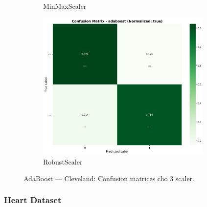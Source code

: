 \begin{figure}[H]
\begin{subfigure}[b]{0.31\textwidth}
\caption{MinMaxScaler}\label{fig:adaboost_clev_cm_minmax}
\end{subfigure}\hfill
\begin{subfigure}[b]{0.31\textwidth}\centering
\includegraphics[width=0.95\textwidth]{Result/cleveland_dataset/confusion_matrices/adaboost_numeric_dataset_RobustScaler.png}
\caption{RobustScaler}\label{fig:adaboost_clev_cm_robust}
\end{subfigure}
\caption{AdaBoost — Cleveland: Confusion matrices cho 3 scaler.}
\label{fig:adaboost_clev_confusions}
\end{figure}

\FloatBarrier

\subsubsection{Heart Dataset}\label{subsubsec:adaboost-heart}

